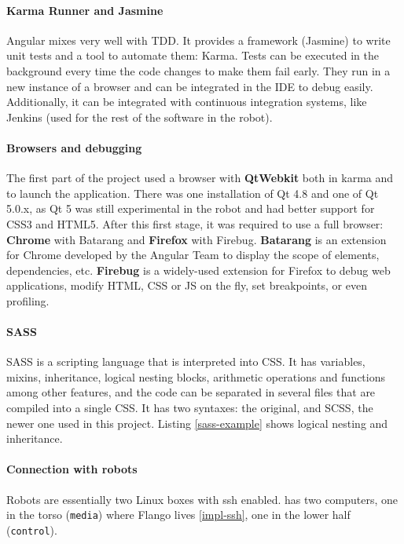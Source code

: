\paragraph{Karma Runner and Jasmine} Angular mixes very well with \ac{TDD}. 
It provides a framework (Jasmine) to write unit tests and a tool to automate them: Karma.
Tests can be executed in the background every time the code changes to make them fail early.
They run in a new instance of a browser and can be integrated in the \ac{IDE} to debug easily.
Additionally, it can be integrated with continuous integration systems, like Jenkins (used for the rest of the software in the robot).

\paragraph{Browsers and debugging} The first part of the project used a browser with \textbf{QtWebkit} both in karma and to launch the application.
There was one installation of Qt 4.8 and one of Qt 5.0.x, as Qt 5 was still experimental in the robot and had better support for \ac{CSS3} and \ac{HTML5}.
After this first stage, it was required to use a full browser: \textbf{Chrome} with Batarang and \textbf{Firefox} with Firebug.
\textbf{Batarang} is an extension for Chrome developed by the Angular Team to display the scope of elements, dependencies, etc.
\textbf{Firebug} is a widely-used extension for Firefox to debug web applications, modify \ac{HTML}, \ac{CSS} or \ac{JS} on the fly, set breakpoints, or even profiling.

\paragraph{SASS} \ac{SASS} is a scripting language that is interpreted into \ac{CSS}.
It has variables, mixins, inheritance, logical nesting blocks, arithmetic operations and functions among other features, and the code can be separated in several files that are compiled into a single \ac{CSS}.
It has two syntaxes: the original, and \ac{SCSS}, the newer one used in this project.
Listing \ref{sass-example} shows logical nesting and inheritance.



\paragraph{Connection with robots} Robots are essentially two Linux boxes with \ac{ssh} enabled.
 has two computers, one in the torso (\texttt{media}) where Flango lives \ref{impl-ssh}, one in the lower half (\texttt{control}).

